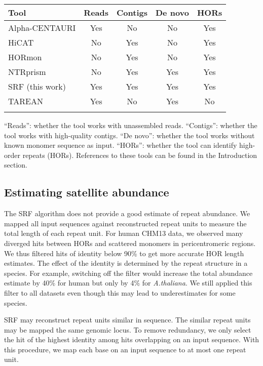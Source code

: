 \documentclass{bioinfo}
\begin{document}
\begin{table}[!hb]
{\label{tab:tool}
\begin{tabular}{p{3.6cm}cccc}
\toprule
Tool & Reads & Contigs & De novo & HORs \\
\midrule
Alpha-CENTAURI & Yes & No & No & Yes \\
HiCAT    & No & Yes & No & Yes \\
HORmon   & No & Yes & No & Yes \\
NTRprism & No & Yes & Yes  & Yes \\
SRF (this work) & Yes & Yes & Yes  & Yes \\
TAREAN   & Yes& No  & Yes  & No \\
\botrule
\end{tabular}}{``Reads'': whether the tool works with unassembled reads.
``Contigs'': whether the tool works with high-quality contigs. ``De novo'':
whether the tool works without known monomer sequence as input. ``HORs'':
whether the tool can identify high-order repeats (HORs). References to these
tools can be found in the Introduction section.}
\end{table}

\subsection{Estimating satellite abundance}

The SRF algorithm does not provide a good estimate of repeat abundance. We
mapped all input sequences against reconstructed repeat units to measure the
total length of each repeat unit.
For human CHM13 data, we observed many diverged hits
between HORs and scattered monomers in pericentromeric regions. We thus filtered
hits of identity below 90\% to get more accurate HOR length estimates.
The effect of the identity is determined by the repeat structure in a species.
For example, switching off the filter would increase the total abundance
estimate by 40\% for human but only by 4\% for \emph{A.thaliana}. We still
applied this filter to all datasets even though this may lead to underestimates
for some species.

SRF may reconstruct repeat units similar in sequence. The similar repeat units
may be mapped the same genomic locus. To remove redundancy, we only select the
hit of the highest identity among hits overlapping on an input sequence.
With this procedure, we map each base on an input sequence to at most one
repeat unit.
\end{document}
